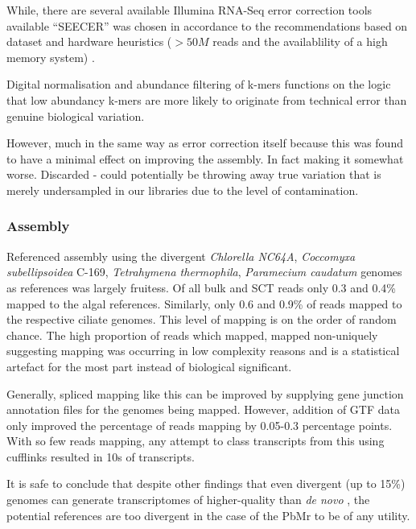While, there are several available Illumina RNA-Seq error correction tools available 
``SEECER'' was chosen in accordance to the recommendations based on dataset and hardware
heuristics (\(>50M\) reads and the availablility of a high memory system) \citep{Macmanes2015}.



Digital normalisation and abundance filtering of k-mers functions on the logic 
that low abundancy k-mers are more likely to originate from technical error
than genuine biological variation.



However, much in the same way as error correction itself because this was found to
have a minimal effect on improving the assembly.
In fact making it somewhat worse. 
Discarded - could potentially be throwing away true variation that is merely undersampled
in our libraries due to the level of contamination.









\subsubsection{Assembly}

Referenced assembly using the divergent \textit{Chlorella NC64A},
\textit{Coccomyxa subellipsoidea} C-169, \textit{Tetrahymena thermophila},
\textit{Paramecium caudatum} genomes as references was largely fruitess.
Of all bulk and SCT reads only 0.3 and 0.4\% mapped to the 
algal references.  Similarly, only 0.6 and 0.9\% of reads mapped to the 
respective ciliate genomes.   This level of mapping is on the order
of random chance.  The high proportion of reads which mapped, mapped non-uniquely
suggesting mapping was occurring in low complexity reasons and is a statistical
artefact for the most part instead of biological significant.

Generally, spliced mapping like this can be improved by supplying 
gene junction annotation files for the genomes being mapped.
However, addition of GTF data only improved the percentage of reads mapping
by 0.05-0.3 percentage points.  With so few reads mapping, any attempt to 
class transcripts from this using cufflinks resulted in 10s of transcripts.

It is safe to conclude that despite other findings that even divergent 
(up to 15\%) genomes can generate transcriptomes of higher-quality
than \textit{de novo} \citep{Vijay2013}, the potential references
are too divergent in the case of the PbMr to be of any utility.


